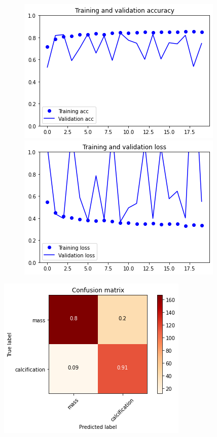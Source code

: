 \documentclass{article}
\begin{document}
\begin{figure}[h]
    \centering
    \begin{minipage}{0.45\textwidth}
        \centering
        \includegraphics[scale=0.46]{./img/preTrainValResNet50_ft.png}
    \end{minipage}\hfill
    \begin{minipage}{0.45\textwidth}
        \centering
        \includegraphics[scale=0.46]{./img/preTrainLossResNet50_ft.png}
    \end{minipage}
\end{figure}

\begin{center}
\begin{minipage}{0.45\textwidth}
        \includegraphics[scale=0.6]{./img/cmPreTrainResNet50_ft.png}
    \end{minipage}
\end{center}
\end{document}
